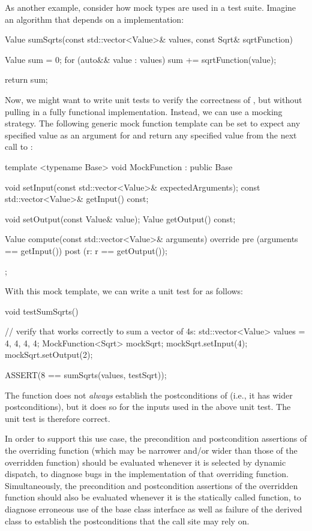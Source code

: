 As another example, consider how mock types are used in a test suite. Imagine an algorithm that depends on a  implementation:

\begin{codeblock}
Value sumSqrts(const std::vector<Value>& values, const Sqrt& sqrtFunction) {
  Value sum = 0;
  for (auto&& value : values)
    sum += sqrtFunction(value);
    
  return sum;
}
\end{codeblock}

Now, we might want to write unit tests to verify the correctness of , but without pulling in a fully functional  implementation. Instead, we can use a mocking strategy. The following generic mock function template can be set to expect any specified value as an argument for and return any specified value from the next call to :

\begin{codeblock}
template <typename Base>
void MockFunction : public Base {
  void setInput(const std::vector<Value>& expectedArguments);
  const std::vector<Value>& getInput() const;
  
  void setOutput(const Value& value);
  Value getOutput() const;
  
  Value compute(const std::vector<Value>& arguments) override
    pre (arguments == getInput())
    post (r: r == getOutput());
};
\end{codeblock}

With this mock template, we can write a unit test for  as follows:

\begin{codeblock}
void testSumSqrts() {
  // verify that  works correctly to sum a vector of 4s:
  std::vector<Value> values = {4, 4, 4, 4};
  MockFunction<Sqrt> mockSqrt;
  mockSqrt.setInput({4});
  mockSqrt.setOutput({2});
  
  ASSERT(8 == sumSqrts(values, testSqrt));
}
\end{codeblock}

The function  does not \emph{always} establish the postconditions of  (i.e., it has wider postconditions), but it does so for the inputs used in the above unit test. The unit test is therefore correct.

In order to support this use case, the precondition and postcondition assertions of the overriding function  (which may be narrower and/or wider than those of the overridden function) should be evaluated whenever it is selected by dynamic dispatch, to diagnose bugs in the implementation of that overriding function. Simultaneously, the precondition and postcondition assertions of the overridden function should also be evaluated whenever it is the statically called function, to diagnose erroneous use of the base class interface as well as failure of the derived class to establish the postconditions that the call site may rely on. 

